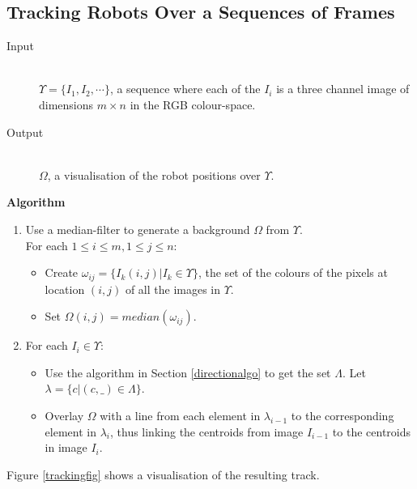 \documentclass[10pt,a4paper]{article}
\begin{document}
\subsection{Tracking Robots Over a Sequences of Frames}\label{trackingalgo}
\begin{description}
\item[Input] \hfill \\
    $\Upsilon = \{I_1, I_2, \cdots\}$, a sequence where each of the $I_i$ is a 
    three channel image of dimensions $m \times n$ in the RGB colour-space.
\item[Output] \hfill \\
    $\Omega$, a visualisation of the robot positions over $\Upsilon$.
\end{description}
\textbf{Algorithm}
\begin{enumerate}
    \item
    Use a median-filter to generate a background $\Omega$ from $\Upsilon$. \\
    For each $1 \le i \le m, 1 \le j \le n$:
    \begin{itemize}
        \item
        Create $\omega_{ij} = \{I_k(i,j) | I_k \in \Upsilon\}$, the set of the 
        colours of the pixels at location $(i,j)$ of all the images in 
        $\Upsilon$.
        \item
        Set $\Omega(i,j) = median(\omega_{ij})$.
    \end{itemize}
    \item
    For each $I_i \in \Upsilon$:
    \begin{itemize}
        \item
        Use the algorithm in Section \ref{directionalgo} to get the set 
        $\Lambda$. Let $\lambda = \{c | (c, \_) \in \Lambda\}$.
        \item
        Overlay $\Omega$ with a line from each element in $\lambda_{i-1}$ to 
        the corresponding element in $\lambda_i$, thus linking the centroids 
        from image $I_{i-1}$ to the centroids in image $I_i$.
    \end{itemize}
\end{enumerate} 
Figure \ref{trackingfig} shows a visualisation of the resulting track.
\end{document}
